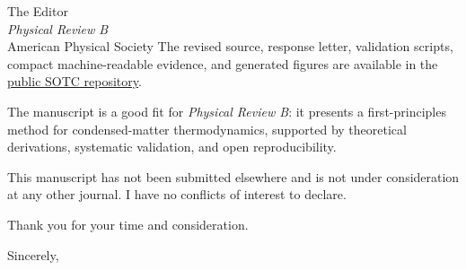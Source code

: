 \documentclass[10pt]{letter}
\begin{document}
\begin{letter}{The Editor \\
\textit{Physical Review B} \\
American Physical Society}
The revised source, response letter, validation scripts, compact
machine-readable evidence, and generated figures are available in the
\href{https://github.com/albert-hzbn/SOTC}{public SOTC repository}.

The manuscript is a good fit for \textit{Physical Review B}: it presents a
first-principles method for condensed-matter thermodynamics, supported by
theoretical derivations, systematic validation, and open reproducibility.

This manuscript has not been submitted elsewhere and is not under
consideration at any other journal. I have no conflicts of interest to
declare.

Thank you for your time and consideration.

\closing{Sincerely,}

\end{letter}
\end{document}
